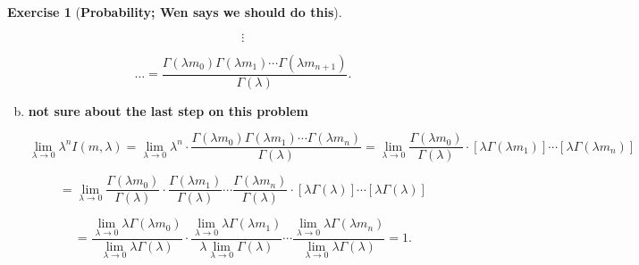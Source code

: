 \documentclass{article}
\theoremstyle{definition}
\newtheorem{exercise}{Exercise}
\theoremstyle{definition}
\theoremstyle{definition}
\theoremstyle{definition}
\begin{document}
\begin{exercise}[\textbf{Probability; Wen says we should do this}]
\begin{enumerate}[(a)]
\[
\vdots
\]

\[
\ldots =  \frac{\Gamma(\lambda m_0) \Gamma(\lambda m_1) \cdots \Gamma(\lambda m_{n+1})}{\Gamma(\lambda)}.
\]

\item \textbf{not sure about the last step on this problem}

\[
\lim_{\lambda \to 0} \lambda^n I(m, \lambda) = \lim_{\lambda \to 0} \lambda^n \cdot   \frac{\Gamma(\lambda m_0) \Gamma(\lambda m_1) \cdots \Gamma(\lambda m_n)}{\Gamma(\lambda)} = \lim_{\lambda \to 0}  \frac{ \Gamma(\lambda m_0) }{\Gamma(\lambda)} \cdot  [\lambda  \Gamma(\lambda m_1)] \cdots[ \lambda \Gamma(\lambda m_n)]
\]

\[
= \lim_{\lambda \to 0}  \frac{ \Gamma(\lambda m_0) }{\Gamma(\lambda)}\cdot \frac{\Gamma(\lambda m_1)}{\Gamma(\lambda)} \cdots \frac{\Gamma(\lambda m_n)}{\Gamma(\lambda)}  \cdot  [\lambda  \Gamma(\lambda )] \cdots[ \lambda \Gamma(\lambda )]
\]


\[
 = \frac{  \lim_{\lambda \to 0} \lambda  \Gamma(\lambda m_0) } { \lim_{\lambda \to 0}   \lambda \Gamma(\lambda)}\cdot  \frac{  \lim_{\lambda \to 0} \lambda  \Gamma(\lambda m_1)}{ \lambda \lim_{\lambda \to 0}  \Gamma(\lambda)} \cdots  \frac{   \lim_{\lambda \to 0} \lambda \Gamma(\lambda m_n)}{ \lim_{\lambda \to 0} \lambda \Gamma(\lambda)}  = 1.
\]


%

%
%


\end{enumerate}
\end{exercise}
\end{document}
